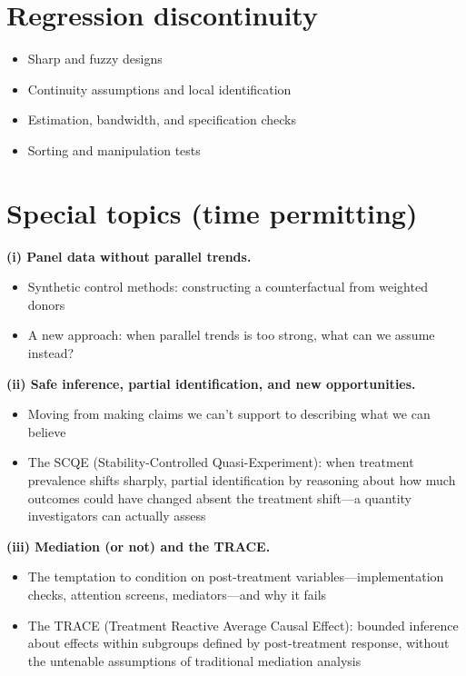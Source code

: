 \documentclass[PS]{syllabus}
\begin{document}
\begin{syllabus}
\section{Regression discontinuity}
\begin{itemize}
\item Sharp and fuzzy designs
\item Continuity assumptions and local identification
\item Estimation, bandwidth, and specification checks
\item Sorting and manipulation tests
\end{itemize}

\section*{Special topics (time permitting)}

\textbf{(i) Panel data without parallel trends.}
\begin{itemize}
\item Synthetic control methods: constructing a counterfactual from weighted donors
\item A new approach: when parallel trends is too strong, what can we assume instead?
\end{itemize}

\textbf{(ii) Safe inference, partial identification, and new opportunities.}
\begin{itemize}
\item Moving from making claims we can't support to describing what we can believe
\item The SCQE (Stability-Controlled Quasi-Experiment): when treatment prevalence shifts sharply, partial identification by reasoning about how much outcomes could have changed absent the treatment shift---a quantity investigators can actually assess
\end{itemize}

\textbf{(iii) Mediation (or not) and the TRACE.}
\begin{itemize}
\item The temptation to condition on post-treatment variables---implementation checks, attention screens, mediators---and why it fails
\item The TRACE (Treatment Reactive Average Causal Effect): bounded inference about effects within subgroups defined by post-treatment response, without the untenable assumptions of traditional mediation analysis
\end{itemize}


\end{syllabus}
\end{document}
